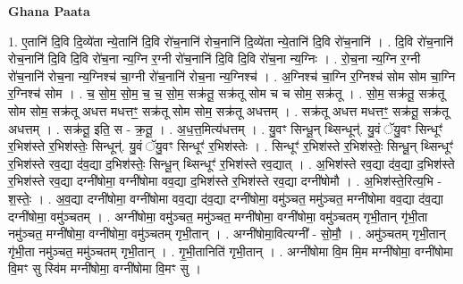 \documentclass[17pt]{extarticle}
\begin{document}
\textbf{Ghana Paata } \newline

1. ए॒तानि॑ दि॒वि दि॒व्ये॑ता न्ये॒तानि॑ दि॒वि रो॑च॒नानि॑ रोच॒नानि॑ दि॒व्ये॑ता न्ये॒तानि॑ दि॒वि रो॑च॒नानि॑ । . दि॒वि रो॑च॒नानि॑ रोच॒नानि॑ दि॒वि दि॒वि रो॑च॒ना न्य॒ग्नि र॒ग्नी रो॑च॒नानि॑ दि॒वि दि॒वि रो॑च॒ना न्य॒ग्निः । . रो॒च॒ना न्य॒ग्नि र॒ग्नी रो॑च॒नानि॑ रोच॒ना न्य॒ग्निश्च॑ चा॒ग्नी रो॑च॒नानि॑ रोच॒ना न्य॒ग्निश्च॑ । . अ॒ग्निश्च॑ चा॒ग्नि र॒ग्निश्च॑ सोम सोम चा॒ग्नि र॒ग्निश्च॑ सोम । . च॒ सो॒म॒ सो॒म॒ च॒ च॒ सो॒म॒ सक्र॑तू॒ सक्र॑तू सोम च च सोम॒ सक्र॑तू । . सो॒म॒ सक्र॑तू॒ सक्र॑तू सोम सोम॒ सक्र॑तू अधत्त मधत्तꣳ॒॒ सक्र॑तू सोम सोम॒ सक्र॑तू अधत्तम् । . सक्र॑तू अधत्त मधत्तꣳ॒॒ सक्र॑तू॒ सक्र॑तू अधत्तम् । . सक्र॑तू॒ इति॒ स - क्र॒तू॒ । . अ॒ध॒त्त॒मित्य॑धत्तम् । . यु॒वꣳ सिन्धू॒न् थ्सिन्धून्॑. यु॒वं ॅयु॒वꣳ सिन्धूꣳ॑ र॒भिश॑स्ते र॒भिश॑स्तेः॒ सिन्धून्॑. यु॒वं ॅयु॒वꣳ सिन्धूꣳ॑ र॒भिश॑स्तेः । . सिन्धूꣳ॑ र॒भिश॑स्ते र॒भिश॑स्तेः॒ सिन्धू॒न् थ्सिन्धूꣳ॑ र॒भिश॑स्ते रव॒द्या द॑व॒द्या द॒भिश॑स्तेः॒ सिन्धू॒न् थ्सिन्धूꣳ॑ र॒भिश॑स्ते रव॒द्यात् । . अ॒भिश॑स्ते रव॒द्या द॑व॒द्या द॒भिश॑स्ते र॒भिश॑स्ते रव॒द्या दग्नी॑षोमा॒ वग्नी॑षोमा वव॒द्या द॒भिश॑स्ते र॒भिश॑स्ते रव॒द्या दग्नी॑षोमौ । . अ॒भिश॑स्ते॒रित्य॒भि - श॒स्तेः॒ । . अ॒व॒द्या दग्नी॑षोमा॒ वग्नी॑षोमा वव॒द्या द॑व॒द्या दग्नी॑षोमा॒ वमु॑ञ्चत॒ ममु॑ञ्चत॒ मग्नी॑षोमा वव॒द्या द॑व॒द्या दग्नी॑षोमा॒ वमु॑ञ्चतम् । . अग्नी॑षोमा॒ वमु॑ञ्चत॒ ममु॑ञ्चत॒ मग्नी॑षोमा॒ वग्नी॑षोमा॒ वमु॑ञ्चतम् गृभी॒तान् गृ॑भी॒ता नमु॑ञ्चत॒ मग्नी॑षोमा॒ वग्नी॑षोमा॒ वमु॑ञ्चतम् गृभी॒तान् । . अग्नी॑षोमा॒वित्यग्नी᳚ - सो॒मौ॒ । . अमु॑ञ्चतम् गृभी॒तान् गृ॑भी॒ता नमु॑ञ्चत॒ ममु॑ञ्चतम् गृभी॒तान् । . गृ॒भी॒तानिति॑ गृभी॒तान् । . अग्नी॑षोमा वि॒म मि॒म मग्नी॑षोमा॒ वग्नी॑षोमा वि॒मꣳ सु स्वि॑म मग्नी॑षोमा॒ वग्नी॑षोमा वि॒मꣳ सु । \newline
\end{document}
